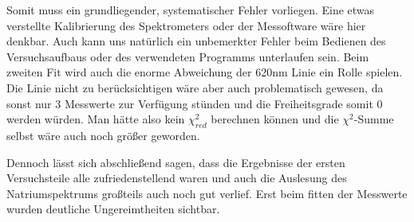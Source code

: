\documentclass{article}
\begin{document}
Somit muss ein grundliegender, systematischer Fehler vorliegen. Eine etwas verstellte Kalibrierung des Spektrometers oder der Messoftware wäre hier denkbar. Auch kann uns natürlich ein unbemerkter Fehler beim Bedienen des Versuchsaufbaus oder des verwendeten Programms unterlaufen sein. Beim zweiten Fit wird auch die enorme Abweichung der 620nm Linie ein Rolle spielen. Die Linie nicht zu berücksichtigen wäre aber auch problematisch gewesen, da sonst nur 3 Messwerte zur Verfügung stünden und die Freiheitsgrade somit 0 werden würden. Man hätte also kein $\chi^2_{red}$ berechnen können und die $\chi^2$-Summe selbst wäre auch noch größer geworden.

Dennoch lässt sich abschließend sagen, dass die Ergebnisse der ersten Versuchsteile alle zufriedenstellend waren und auch die Auslesung des Natriumspektrums großteils auch noch gut verlief. Erst beim fitten der Messwerte wurden deutliche Ungereimtheiten sichtbar. 

\newpage

\end{document}
